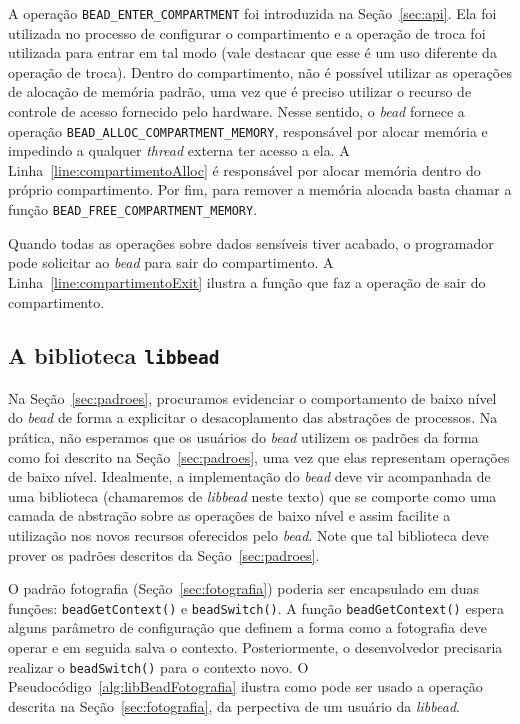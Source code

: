 A operação \texttt{BEAD\_ENTER\_COMPARTMENT} foi introduzida na Seção~\ref{sec:api}. Ela foi
utilizada no processo de configurar o compartimento e a operação de troca foi
utilizada para entrar em tal modo (vale destacar que esse é um uso diferente da
operação de troca). Dentro do compartimento, não é possível utilizar as operações de alocação de memória
padrão, uma vez que é preciso utilizar o recurso de controle de acesso fornecido
pelo hardware. Nesse sentido, o \emph{bead} fornece a operação
\texttt{BEAD\_ALLOC\_COMPARTMENT\_MEMORY}, responsável por alocar memória e impedindo
a qualquer \emph{thread} externa ter acesso a ela.
A Linha~\ref{line:compartimentoAlloc} é responsável por alocar memória
dentro do próprio compartimento. Por fim, para remover a memória alocada basta
chamar a função \texttt{BEAD\_FREE\_COMPARTMENT\_MEMORY}.

Quando todas as operações sobre dados sensíveis tiver acabado, o programador
pode solicitar ao \emph{bead} para sair do compartimento. A
Linha~\ref{line:compartimentoExit} ilustra a função que faz a operação de sair
do compartimento.

\subsection{A biblioteca \texttt{libbead}}

Na Seção~\ref{sec:padroes}, procuramos evidenciar o comportamento de baixo
nível do \emph{bead} de forma a explicitar o desacoplamento das abstrações de
processos. Na prática, não esperamos que os usuários do \emph{bead} utilizem os
padrões da forma como foi descrito na Seção~\ref{sec:padroes}, uma vez que elas
representam operações de baixo nível. Idealmente, a implementação do
\emph{bead} deve vir acompanhada de uma biblioteca (chamaremos de
\emph{libbead} neste texto) que se comporte como uma camada de abstração sobre
as operações de baixo nível e assim facilite a utilização nos novos recursos
oferecidos pelo \emph{bead}. Note que tal biblioteca deve prover os padrões
descritos da Seção~\ref{sec:padroes}.

O padrão fotografia (Seção~\ref{sec:fotografia}) poderia ser encapsulado em
duas funções: \texttt{beadGetContext()} e \texttt{beadSwitch()}. A função
\texttt{beadGetContext()} espera alguns parâmetro de configuração que definem a
forma como a fotografia deve operar e em seguida salva o contexto.
Posteriormente, o desenvolvedor precisaria realizar o \texttt{beadSwitch()}
para o contexto novo. O Pseudocódigo~\ref{alg:libBeadFotografia} ilustra como
pode ser usado a operação descrita na Seção~\ref{sec:fotografia}, da perpectiva
de um usuário da \emph{libbead}.

